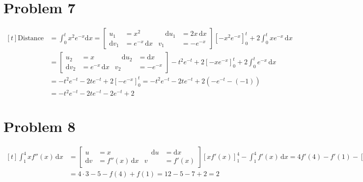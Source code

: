 \documentclass[preview, margin=0.6in]{standalone}
\newcommand*{\problem}[1]{\section*{Problem #1}}
\begin{document}
\problem{7}
$\begin{aligned}[t]
	\text{Distance traveled}
	&=\int_{0}^{t}x^2e^{-x}\mathrm{d}x
	=\left[\begin{alignedat}{2}
			u_1&=x^2 &\quad \mathrm{d}u_1&=2x \,\mathrm{d}x \\
			\mathrm{d}v_1&=e^{-x}\,\mathrm{d}x & v_1&=-e^{-x}
	\end{alignedat}\right] 
	\left[-x^2e^{-x}\right]_{0}^{t}+2\int_{0}^{t}xe^{-x}\,\mathrm{d}x \\
	&=\left[\begin{alignedat}{2}
			u_2&=x &\quad \mathrm{d}u_2&=\mathrm{d}x \\
			\mathrm{d}v_2&=e^{-x}\,\mathrm{d}x & v_2&=-e^{-x}
	\end{alignedat}\right] 
	-t^2e^{-t}+2 \left[-xe^{-x}\right]_{0}^{t}+2 \int_{0}^{t}e^{-x}\,\mathrm{d}x \\
	&=-t^2e^{-t}-2te^{-t}+2 \left[-e^{-x}\right]_{0}^{t}
	=-t^2e^{-t}-2te^{-t}+2\left(-e^{-t}-(-1)\right) \\
	&=\boxed{-t^2e^{-t}-2te^{-t}-2e^{-t}+2}
\end{aligned}$

\problem{8}
$\begin{aligned}[t]
    \int_{1}^{4}xf''(x)\,\mathrm{d}x
	&=\left[\begin{alignedat}{2}
			u&=x &\quad \mathrm{d}u&=\mathrm{d}x \\
			\mathrm{d}v&=f''(x)\,\mathrm{d}x & v&=f'(x)
	\end{alignedat}\right] 
	\left[xf'(x)\right]_{1}^{4}-\int_{1}^{4}f'(x)\,\mathrm{d}x
	=4f'(4)-f'(1)-\left[f(x)\right]_{1}^{4} \\
	&=4\cdot3-5-f(4)+f(1)
	=12-5-7+2
	=\boxed{2}
\end{aligned}$
\end{document}
